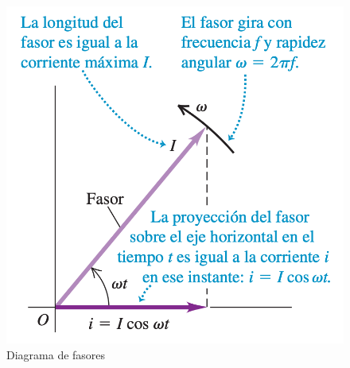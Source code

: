 \begin{figure}[h]
\centering
\includegraphics[scale=0.4]{fig/fasor1}
\caption{Diagrama de fasores}
\label{fig:fasor1}
\end{figure}










